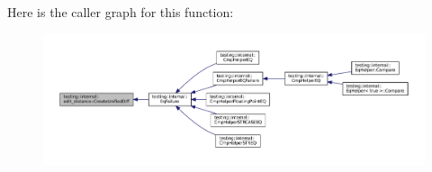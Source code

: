 Here is the caller graph for this function\+:
\nopagebreak
\begin{figure}[H]
\begin{center}
\leavevmode
\includegraphics[width=350pt]{namespacetesting_1_1internal_1_1edit__distance_ac4c24a581ff433d7aca7ed12c9133fb1_icgraph}
\end{center}
\end{figure}
